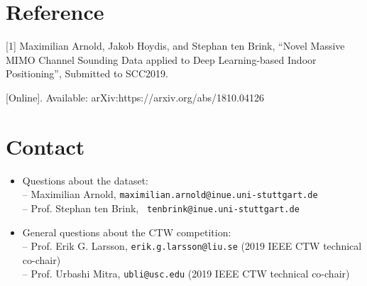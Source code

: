 \documentclass[letter]{moderncv} %
\begin{document}





\section{Reference}%
[1] Maximilian Arnold, Jakob Hoydis, and Stephan ten Brink,  ``Novel Massive MIMO Channel Sounding Data applied to Deep Learning-based Indoor Positioning'', Submitted to SCC2019.

[Online]. Available: arXiv:https://arxiv.org/abs/1810.04126

\section{Contact}

\begin{itemize}
\item Questions about the dataset: \\
-- Maximilian Arnold, \texttt{maximilian.arnold@inue.uni-stuttgart.de} \\
-- Prof. Stephan ten Brink, \texttt{
	tenbrink@inue.uni-stuttgart.de} \\

\item General questions about the CTW competition: \\
-- Prof. Erik G. Larsson, \texttt{erik.g.larsson@liu.se} (2019 IEEE CTW technical co-chair) \\
-- Prof. Urbashi Mitra, \texttt{ubli@usc.edu} (2019 IEEE CTW technical co-chair) 

\end{itemize}

\vspace{10ex}

\end{document}
